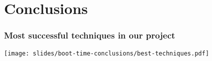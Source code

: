\section{Conclusions}

\begin{frame}
\frametitle{Most successful techniques in our project}
\texttt{[image: slides/boot-time-conclusions/best-techniques.pdf]}
\end{frame}
